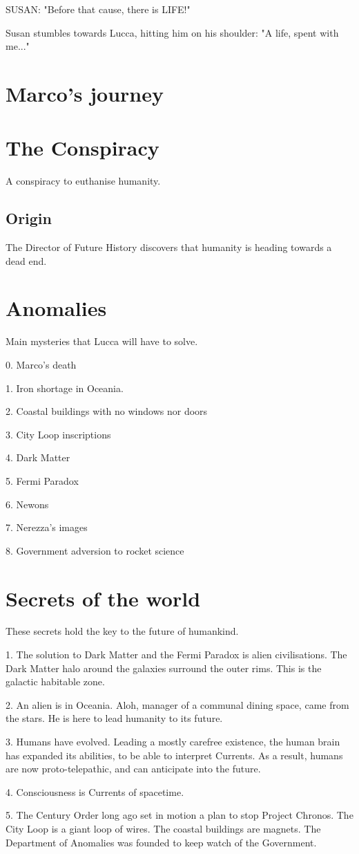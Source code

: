 \documentclass[11pt]{article}
\begin{document}
SUSAN: "Before that cause, there is LIFE!"

Susan stumbles towards Lucca, hitting him on his shoulder: "A life, spent with me..."



\section{Marco's journey}



\section{The Conspiracy}
A conspiracy to euthanise humanity.

	\subsection{Origin}
	The Director of Future History discovers that humanity is heading towards a dead end. 
	


\section{Anomalies}
Main mysteries that Lucca will have to solve.

0. Marco's death

1. Iron shortage in Oceania.

2. Coastal buildings with no windows nor doors

3. City Loop inscriptions

4. Dark Matter

5. Fermi Paradox

6. Newons

7. Nerezza's images

8. Government adversion to rocket science


\section{Secrets of the world}
These secrets hold the key to the future of humankind.

1. The solution to Dark Matter and the Fermi Paradox is alien civilisations. 
The Dark Matter halo around the galaxies surround the outer rims. 
This is the galactic habitable zone. 

2. An alien is in Oceania. 
Aloh, manager of a communal dining space, came from the stars. 
He is here to lead humanity to its future.

3. Humans have evolved. 
Leading a mostly carefree existence, the human brain has expanded its abilities, to be able to interpret Currents. 
As a result, humans are now proto-telepathic, and can anticipate into the future.

4. Consciousness is Currents of spacetime.

5. The Century Order long ago set in motion a plan to stop Project Chronos.
The City Loop is a giant loop of wires.
The coastal buildings are magnets.
The Department of Anomalies was founded to keep watch of the Government.
\end{document}
